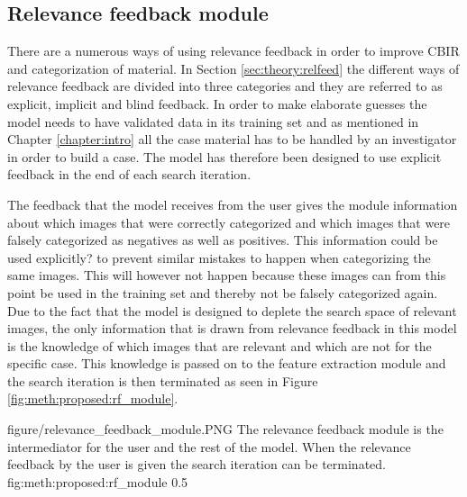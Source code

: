 
\subsection{Relevance feedback module}
\label{sec:method:proposed:rf}
There are a numerous ways of using relevance feedback in order to improve CBIR and categorization of material. In Section \ref{sec:theory:relfeed} the different ways of relevance feedback are divided into three categories and they are referred to as explicit, implicit and blind feedback. 
In order to make elaborate guesses the model needs to have validated data in its training set and as mentioned in Chapter \ref{chapter:intro} all the case material has to be handled by an investigator in order to build a case. The model has therefore been designed to use explicit feedback in the end of each search iteration.

The feedback that the model receives from the user gives the module information about which images that were correctly categorized and which images that were falsely categorized as negatives as well as positives. This information could be used explicitly? to prevent similar mistakes to happen when categorizing the same images. This will however not happen because these images can from this point be used in the training set and  thereby not be falsely categorized again. Due to the fact that the model is designed to deplete the search space of relevant images, the only information that is drawn from relevance feedback in this model is the knowledge of which images that are relevant and which are not for the specific case. This knowledge is passed on to the feature extraction module and the search iteration is then terminated as seen in Figure \ref{fig:meth:proposed:rf_module}.

\singlefigurenear
{figure/relevance_feedback_module.PNG}
{The relevance feedback module is the intermediator for the user and the rest of the model. When the relevance feedback by the user is given the search iteration can be terminated.}
{fig:meth:proposed:rf_module}
{0.5}

